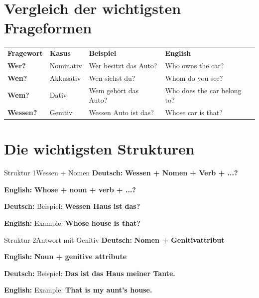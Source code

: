 \documentclass[a4paper,11pt]{article}
\newcommand{\GermanText}[1]{\textbf{Deutsch: }#1\par}
\newcommand{\EnglishText}[1]{{\small\color{SoftGray}\textbf{English: }#1\par}}
\begin{document}
    
    \section{Vergleich der wichtigsten Frageformen}
        
        \begin{longtable}{>{\bfseries}p{2.6cm}|p{2.6cm}|p{4.8cm}|p{4.1cm}}
            \rowcolor{HeaderBlueDark}
            \color{white}\textbf{Fragewort} &
            \color{white}\textbf{Kasus} &
            \color{white}\textbf{Beispiel} &
            \color{white}\textbf{English} \\
            
            Wer? &
            Nominativ &
            Wer besitzt das Auto? &
            Who owns the car? \\
            
            Wen? &
            Akkusativ &
            Wen siehst du? &
            Whom do you see? \\
            
            Wem? &
            Dativ &
            Wem gehört das Auto? &
            Who does the car belong to? \\
            
            Wessen? &
            Genitiv &
            Wessen Auto ist das? &
            Whose car is that? \\
        \end{longtable}
    
    
    \section{Die wichtigsten Strukturen}
        
        \begin{grammarentry}{Struktur 1}{Wessen + Nomen}
            \GermanText{\textbf{Wessen + Nomen + Verb + ...?}}
            \EnglishText{\textbf{Whose + noun + verb + ...?}}
            
            \GermanText{Beispiel: \textbf{Wessen Haus ist das?}}
            \EnglishText{Example: \textbf{Whose house is that?}}
        \end{grammarentry}
        
        
        \begin{grammarentry}{Struktur 2}{Antwort mit Genitiv}
            \GermanText{\textbf{Nomen + Genitivattribut}}
            \EnglishText{\textbf{Noun + genitive attribute}}
            
            \GermanText{Beispiel: \textbf{Das ist das Haus meiner Tante.}}
            \EnglishText{Example: \textbf{That is my aunt's house.}}
        \end{grammarentry}
        
\end{document}
